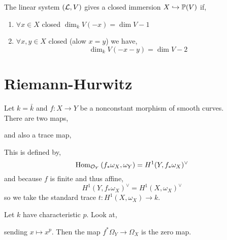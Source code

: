 \documentclass[12pt]{article}
\begin{document}
\begin{prop}
The linear system $(\mathcal{L}, V)$ gives a closed immersion $X \hookrightarrow \mathbb{P}(V)$ if,
\begin{enumerate}
\item $\forall x \in X$ closed $\dim_k V(-x) = \dim{V} - 1$
\item $\forall x, y \in X$ closed (alow $x = y$) we have,
\[ \dim_k V(-x -y) = \dim{V} - 2 \]
\end{enumerate}
\end{prop}

\section{Riemann-Hurwitz}

Let $k = \bar{k}$ and $f : X \to Y$ be a nonconstant morphism of smooth curves.
\bigskip\\
There are two maps,
\begin{center}
\end{center}
and also a trace map,
\begin{center}
\end{center}
This is defined by,
\[ \mathrm{Hom}_{\mathcal{O}_{Y}} \left( f_* \omega_X, \omega_Y \right) = H^1(Y, f_* \omega_X)^\vee \]
and because $f$ is finite and thus affine,
\[ H^1(Y, f_* \omega_X)^\vee = H^1(X, \omega_X)^\vee \]
so we take the standard trace $t : H^1(X, \omega_X) \to k$. 

\begin{example}
Let $k$ have characteristic $p$. Look at,
\begin{center}
\end{center}
sending $x \mapsto x^p$. Then the map $f^* \Omega_{Y} \to \Omega_X$ is the zero map. 
\end{example}
\end{document}
